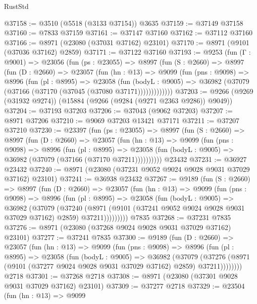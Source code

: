 \begin{lexlean}{RustStd}
\begin{coremodule}
@37158 := @3510 (@5518 (@3133 @37154)) @3635
@37159 := @37149 @37158
@37160 := @7833 @37159
@37161 := @37147 @37160
@37162 := @37112 @37160
@37166 := @8971 (@23080 (@37031 @37162) @23101)
@37170 := @8971 (@9101 (@37036 @37162) @2859)
@37171 := @37122 @37160
@37193 := @9253
    (fun (Γ : @9001) =>
    @23056
      (fun (ps : @23055) =>
      @8997
        (fun (S : @2660) =>
        @8997
          (fun (D : @2660) =>
          @23057
            (fun (hn : @13) =>
            @9099
              (fun (pns : @9098) =>
              @8996
                (fun (pl : @8995) =>
                @23058
                  (fun (bodyL : @9005) =>
                  @36982 (@37079 (@37166 (@37170 (@37045 (@37080 @37171)))))))))))))
@37203 := @9266 (@9269 (@31932 @9274)) (@15884 (@9266 (@9284 (@9271 @2363 @9286)) @9049))
@37204 := @37193 @37203
@37206 := @37043 (@9062 @37203)
@37207 := @8971 @37206
@37210 := @9069 @37203 @13421 @37171
@37211 := @37207 @37210
@37230 := @23397
    (fun (ps : @23055) =>
    @8997
      (fun (S : @2660) =>
      @8997
        (fun (D : @2660) =>
        @23057
          (fun (hn : @13) =>
          @9099
            (fun (pns : @9098) =>
            @8996
              (fun (pl : @8995) =>
              @23058 (fun (bodyL : @9005) => @36982 (@37079 (@37166 (@37170 @37211))))))))))
    @23432
@37231 := @36927 @23432
@37240 := @8971 (@23080 (@37231 @9052 @9024 @9028 @9031 @37029 @37162) @23101)
@37241 := @36938 @23432
@37267 := @9189
    (fun (S : @2660) =>
    @8997
      (fun (D : @2660) =>
      @23057
        (fun (hn : @13) =>
        @9099
          (fun (pns : @9098) =>
          @8996
            (fun (pl : @8995) =>
            @23058
              (fun (bodyL : @9005) =>
              @36982
                (@37079
                  (@37240
                    (@8971
                      (@9101 (@37241 @9052 @9024 @9028 @9031 @37029 @37162) @2859)
                      @37211)))))))))
    @7835
@37268 := @37231 @7835
@37276 := @8971 (@23080 (@37268 @9024 @9028 @9031 @37029 @37162) @23101)
@37277 := @37241 @7835
@37300 := @9189
    (fun (D : @2660) =>
    @23057
      (fun (hn : @13) =>
      @9099
        (fun (pns : @9098) =>
        @8996
          (fun (pl : @8995) =>
          @23058
            (fun (bodyL : @9005) =>
            @36982
              (@37079
                (@37276 (@8971 (@9101 (@37277 @9024 @9028 @9031 @37029 @37162) @2859) @37211))))))))
    @2718
@37301 := @37268 @2718
@37308 := @8971 (@23080 (@37301 @9028 @9031 @37029 @37162) @23101)
@37309 := @37277 @2718
@37329 := @23504
    (fun (hn : @13) =>
    @9099

\end{coremodule}
\end{lexlean}
